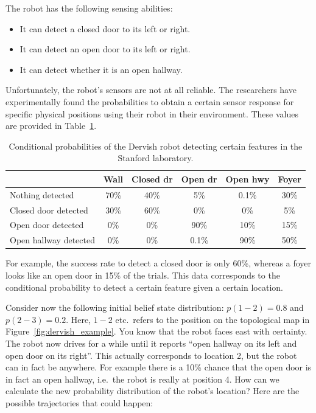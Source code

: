 The robot has the following sensing abilities:
\begin{itemize}
\item It can detect a closed door to its left or right.
\item It can detect an open door to its left or right.
\item It can detect whether it is an open hallway.
\end{itemize}

Unfortunately, the robot's sensors are not at all reliable. The researchers have experimentally found the probabilities to obtain a certain sensor response for specific physical positions using their robot in their environment. These values are provided in Table~\ref{tab:dervish_example}.

\begin{table}
\footnotesize
\begin{tabular}{lccccc}
 	& Wall	& Closed dr & Open dr	& Open hwy & Foyer\\
\hline
Nothing detected	& 70\%	& 40\%&	5\%	& 0.1\% & 30\%\\
Closed door detected & 30\% &	60\%& 0\% &0\%	& 5\%\\
Open door detected & 0\%	& 0\%&	90\% & 10\% & 15\%\\
Open hallway detected & 0\% &	 0\%&	0.1\% & 90\% &50\%\\
\hline
\end{tabular}
\normalsize
\caption{Conditional probabilities of the Dervish robot detecting certain features in the Stanford laboratory.\label{tab:dervish_example}}
\end{table}

For example, the success rate to detect a closed door is only 60\%, whereas a foyer looks like an open door in 15\% of the trials. This data corresponds to the conditional probability to detect a certain feature given a certain location.

Consider now the following initial belief state distribution: $p(1-2)=0.8$ and $p(2-3)=0.2$. Here, $1-2$ etc.\ refers to the position on the topological map in Figure~\ref{fig:dervish_example}. You know that the robot faces east with certainty. The robot now drives for a while until it reports ``open hallway on its left and open door on its right''. This actually corresponds to location 2, but the robot can in fact be anywhere. For example there is a 10\% chance that the open door is in fact an open hallway, i.e.\ the robot is really at position 4. How can we calculate the new probability distribution of the robot's location? Here are the possible trajectories that could happen:

